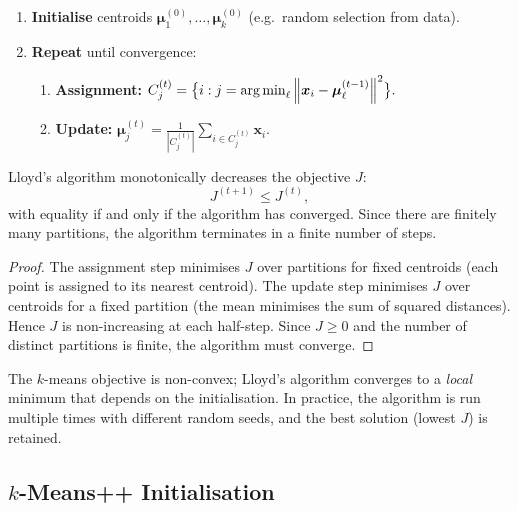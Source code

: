 \begin{algorithme}[title=\textbf{Lloyd's Algorithm ($k$-Means)}]
\begin{enumerate}
  \item \textbf{Initialise} centroids $\bm{\mu}_1^{(0)},\dots,\bm{\mu}_k^{(0)}$ (e.g.\ random selection from data).
  \item \textbf{Repeat} until convergence:
    \begin{enumerate}
      \item \textbf{Assignment:} $C_j^{(t)} = \bigl\{i : j = \operatorname*{arg\,min}_{\ell}\left\| \bm{x}_i - \bm{\mu}_\ell^{(t-1)} \right\|^2\bigr\}.$
      \item \textbf{Update:} $\bm{\mu}_j^{(t)} = \frac{1}{|C_j^{(t)}|}\sum_{i\in C_j^{(t)}} \bm{x}_i.$
    \end{enumerate}
\end{enumerate}
\end{algorithme}

\begin{theorem}
Lloyd's algorithm monotonically decreases the objective $J$:
\[
  J^{(t+1)} \leq J^{(t)},
\]
with equality if and only if the algorithm has converged. Since there are finitely many partitions, the algorithm terminates in a finite number of steps.
\end{theorem}

\begin{proof}
The assignment step minimises $J$ over partitions for fixed centroids (each point is assigned to its nearest centroid). The update step minimises $J$ over centroids for a fixed partition (the mean minimises the sum of squared distances). Hence $J$ is non-increasing at each half-step. Since $J\geq 0$ and the number of distinct partitions is finite, the algorithm must converge.
\end{proof}

\begin{warning}[title=\textbf{Local Minima}]
The $k$-means objective is non-convex; Lloyd's algorithm converges to a \emph{local} minimum that depends on the initialisation. In practice, the algorithm is run multiple times with different random seeds, and the best solution (lowest $J$) is retained.
\end{warning}

\subsection{$k$-Means++ Initialisation}

